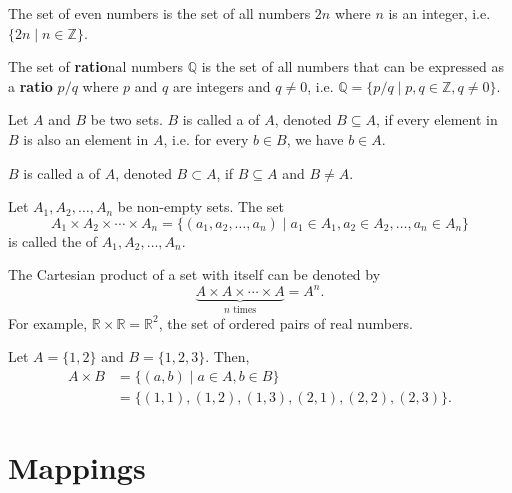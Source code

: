 \begin{exmp}
The set of even numbers is the set of all numbers $ 2n $ where $ n $ is an integer, i.e. $ \{2n\mid n\in\mathbb{Z}\} $.
\end{exmp}

\begin{exmp}
The set of \textbf{ratio}nal numbers $ \mathbb{Q} $ is the set of all numbers that can be expressed as a \textbf{ratio} $ p/q $ where $ p $ and $ q $ are integers and $ q\neq 0 $, i.e. $ \mathbb{Q}=\{p/q\mid p,q\in\mathbb{Z},q\neq 0\} $.
\end{exmp}

\begin{defn}
Let $ A $ and $ B $ be two sets. $ B $ is called a  of $ A $, denoted $ B\subseteq A $, if every element in $ B $ is also an element in $ A $, i.e. for every $ b\in B $, we have $ b\in A $.

$ B $ is called a  of $ A $, denoted $ B\subset A $, if $ B\subseteq A $ and $ B\neq A $.
\end{defn}

\begin{defn}
Let $ A_1,A_2,\ldots,A_n $ be non-empty sets. The set
\begin{equation*}
    A_1\times A_2\times \cdots\times A_n=\{(a_1,a_2,\ldots,a_n)\mid a_1\in A_1,a_2\in A_2,\ldots,a_n\in A_n\}
\end{equation*}
is called the  of $ A_1,A_2,\ldots,A_n $.
\end{defn}

The Cartesian product of a set with itself can be denoted by
\begin{equation*}
    \underbrace{A\times A\times\cdots\times A}_{n\text{ times}}=A^n.
\end{equation*}
For example, $ \mathbb{R}\times\mathbb{R}=\mathbb{R}^2 $, the set of ordered pairs of real numbers.

\begin{exmp}
Let $ A=\{1,2\} $ and $ B=\{1,2,3\} $. Then,
\begin{align*}
    A\times B &= \{(a,b)\mid a\in A,b\in B\} \\
    &= \{(1,1),(1,2),(1,3),(2,1),(2,2),(2,3)\}.
\end{align*}
\end{exmp}

\section{Mappings}

